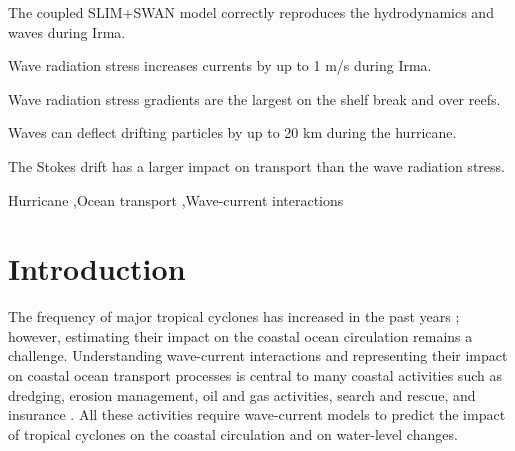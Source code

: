 \documentclass[preprint,12pt,authoryear]{elsarticle}
\begin{document}
\begin{frontmatter}

    \begin{highlights}
        \item The coupled SLIM+SWAN model correctly reproduces the hydrodynamics and waves during Irma.
	    \item Wave radiation stress increases currents by up to 1 m/s during Irma.
	    \item Wave radiation stress gradients are the largest on the shelf break and over reefs. 
	    \item Waves can deflect drifting particles by up to 20 km during the hurricane.
	    \item The Stokes drift has a larger impact on transport than the wave radiation stress.
    \end{highlights}

    \begin{keyword}
        Hurricane \sep Ocean transport \sep Wave-current interactions



    \end{keyword}

\end{frontmatter}

\linenumbers

\section{Introduction}

The frequency of major tropical cyclones has increased in the past years \citep{bhatia2019recent, kossin2020global}; however, estimating their impact on the coastal ocean circulation remains a challenge. Understanding wave-current interactions and representing their impact on coastal ocean transport processes is central to many coastal activities such as dredging, erosion management, oil and gas activities, search and rescue, and insurance \citep{bever2013simulating,li1998three, breivik2013advances}. All these activities require wave-current models to predict the impact of tropical cyclones on the coastal circulation and on water-level changes.
\end{document}
